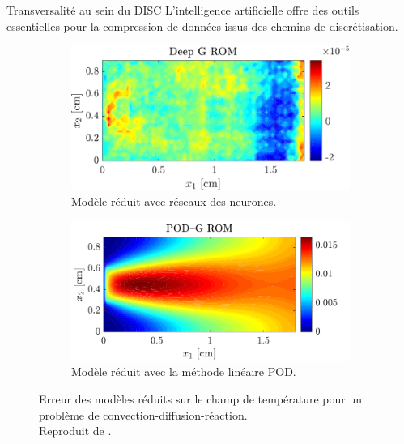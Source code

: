 \documentclass[aspectratio=169, french]{ISAE-Beamer}
\begin{document}
\begin{frame}{Transversalité au sein du DISC}
	L'intelligence artificielle offre des outils essentielles pour la compression de données issus des chemins de discrétisation.
	
	\begin{figure}[t]
		\begin{subfigure}[t]{0.465\textwidth}
			\includegraphics[width=\columnwidth]{DGROM_T_param1.pdf} 
			\caption{Modèle réduit avec réseaux des neurones.}
			\label{fig:DG_ROM}
		\end{subfigure}\hfill
		\begin{subfigure}[t]{0.48\textwidth}
			\includegraphics[width=\columnwidth]{GROM_T_param1.pdf}%
			\caption{Modèle réduit avec la méthode linéaire POD.}
			\label{fig:POD_ROM}
		\end{subfigure}
		\caption[]{Erreur des modèles réduits sur le champ de température pour un problème de convection-diffusion-réaction. \\
		Reproduit de \cite{lee2020}.}%
		\label{fig:deepROM}%
	\end{figure}
\end{frame}
\end{document}
